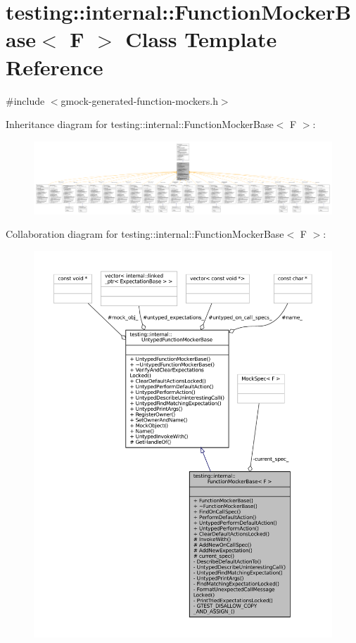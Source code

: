 \hypertarget{classtesting_1_1internal_1_1FunctionMockerBase}{}\section{testing\+:\+:internal\+:\+:Function\+Mocker\+Base$<$ F $>$ Class Template Reference}
\label{classtesting_1_1internal_1_1FunctionMockerBase}


{\ttfamily \#include $<$gmock-\/generated-\/function-\/mockers.\+h$>$}



Inheritance diagram for testing\+:\+:internal\+:\+:Function\+Mocker\+Base$<$ F $>$\+:
\nopagebreak
\begin{figure}[H]
\begin{center}
\leavevmode
\includegraphics[width=350pt]{classtesting_1_1internal_1_1FunctionMockerBase__inherit__graph}
\end{center}
\end{figure}


Collaboration diagram for testing\+:\+:internal\+:\+:Function\+Mocker\+Base$<$ F $>$\+:
\nopagebreak
\begin{figure}[H]
\begin{center}
\leavevmode
\includegraphics[width=350pt]{classtesting_1_1internal_1_1FunctionMockerBase__coll__graph}
\end{center}
\end{figure}
